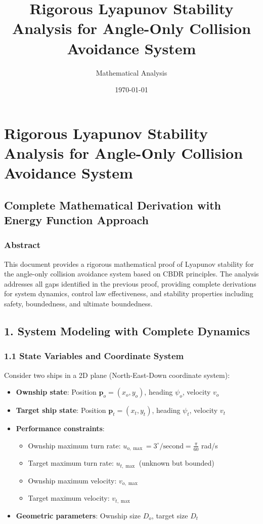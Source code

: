 \documentclass[11pt,a4paper]{article}
\title{Rigorous Lyapunov Stability Analysis for Angle-Only Collision Avoidance System}
\author{Mathematical Analysis}
\date{\today}
\numberwithin{equation}{section}
\begin{document}
\maketitle

\tableofcontents
\newpage

\section{Rigorous Lyapunov Stability Analysis for Angle-Only Collision Avoidance System}

\subsection{Complete Mathematical Derivation with Energy Function Approach}

\subsubsection{Abstract}
This document provides a rigorous mathematical proof of Lyapunov stability for the angle-only collision avoidance system based on CBDR principles. The analysis addresses all gaps identified in the previous proof, providing complete derivations for system dynamics, control law effectiveness, and stability properties including safety, boundedness, and ultimate boundedness.

\subsection{1. System Modeling with Complete Dynamics}

\subsubsection{1.1 State Variables and Coordinate System}

Consider two ships in a 2D plane (North-East-Down coordinate system):
\begin{itemize}
\item \textbf{Ownship state}: Position $\mathbf{p}_o = (x_o, y_o)$, heading $\psi_o$, velocity $v_o$
\item \textbf{Target ship state}: Position $\mathbf{p}_t = (x_t, y_t)$, heading $\psi_t$, velocity $v_t$
\item \textbf{Performance constraints}:
  \begin{itemize}
  \item Ownship maximum turn rate: $u_{o,\max} = 3^\circ/\mathrm{second} = \frac{\pi}{60}$ rad/s
  \item Target maximum turn rate: $u_{t,\max}$ (unknown but bounded)
  \item Ownship maximum velocity: $v_{o,\max}$
  \item Target maximum velocity: $v_{t,\max}$
  \end{itemize}
\item \textbf{Geometric parameters}: Ownship size $D_o$, target size $D_t$
\end{itemize}
\end{document}
